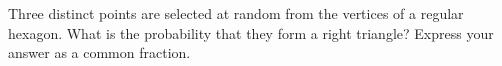 Three distinct points are selected at random from the vertices of a regular hexagon. What is the probability that they form a right triangle? Express your answer as a common fraction.
